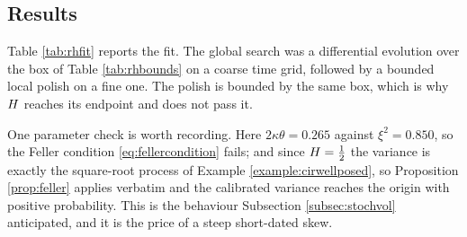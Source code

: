 

\subsection{Results}
\label{subsec:rhresults}

Table \ref{tab:rhfit} reports the fit. The global search was a differential evolution over the box of
Table \ref{tab:rhbounds} on a coarse time grid, followed by a bounded local polish on a fine one.
The polish is bounded by the same box, which is why $H$ reaches its endpoint and does not pass it.

One parameter check is worth recording. Here $2\kappa\theta = 0.265$ against $\xi^{2}=0.850$, so the
Feller condition \eqref{eq:fellercondition} fails; and since $H=\tfrac12$ the variance is
exactly the square-root process of Example \ref{example:cirwellposed}, so Proposition
\ref{prop:feller} applies verbatim and the calibrated variance reaches the origin with positive
probability. This is the behaviour Subsection \ref{subsec:stochvol} anticipated, and it is the price
of a steep short-dated skew.



